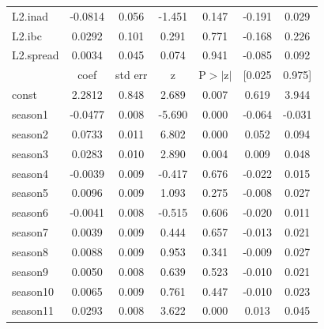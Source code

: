\documentclass[a4paper,
               article,
               12pt,
               openany,
               oneside,
               english,
               brazil]{abntex2}
\numberwithin{equation}{section}
\begin{document}
\begin{longtable}{lcccccc}
    L2.inad   &      -0.0814  &        0.056     &    -1.451  &         0.147        &       -0.191    &        0.029     \\
    L2.ibc    &       0.0292  &        0.101     &     0.291  &         0.771        &       -0.168    &        0.226     \\
    L2.spread &       0.0034  &        0.045     &     0.074  &         0.941        &       -0.085    &        0.092     \\
    \toprule
    & coef & std err & z & P$> |$z$|$ & [0.025 & 0.975]  \\
    \midrule
    const     &       2.2812  &        0.848     &     2.689  &         0.007        &        0.619    &        3.944     \\
    season1   &      -0.0477  &        0.008     &    -5.690  &         0.000        &       -0.064    &       -0.031     \\
    season2   &       0.0733  &        0.011     &     6.802  &         0.000        &        0.052    &        0.094     \\
    season3   &       0.0283  &        0.010     &     2.890  &         0.004        &        0.009    &        0.048     \\
    season4   &      -0.0039  &        0.009     &    -0.417  &         0.676        &       -0.022    &        0.015     \\
    season5   &       0.0096  &        0.009     &     1.093  &         0.275        &       -0.008    &        0.027     \\
    season6   &      -0.0041  &        0.008     &    -0.515  &         0.606        &       -0.020    &        0.011     \\
    season7   &       0.0039  &        0.009     &     0.444  &         0.657        &       -0.013    &        0.021     \\
    season8   &       0.0088  &        0.009     &     0.953  &         0.341        &       -0.009    &        0.027     \\
    season9   &       0.0050  &        0.008     &     0.639  &         0.523        &       -0.010    &        0.021     \\
    season10  &       0.0065  &        0.009     &     0.761  &         0.447        &       -0.010    &        0.023     \\
    season11  &       0.0293  &        0.008     &     3.622  &         0.000        &        0.013    &        0.045     \\

\end{longtable}
\end{document}
